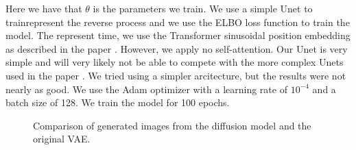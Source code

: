 Here we have that $\theta$ is the parameters we train. We use a simple Unet to trainrepresent the reverse process and we use the ELBO loss function to train the model. The represent time, we use the  Transformer sinusoidal position embedding as described in the paper \cite{diffusion}. However, we apply no self-attention. Our Unet is very simple and will very likely not be able to compete with the more complex Unets used in the paper \cite{diffusion}. We tried using a simpler arcitecture, but the results were not nearly as good. We use the Adam optimizer with a learning rate of $10^{-4}$ and a batch size of 128. We train the model for 100 epochs.

\begin{figure}[h]
    \centering
    \setlength{\belowcaptionskip}{-10pt}
    \caption{Comparison of generated images from the diffusion model and the original VAE.}
    \label{fig:example}%
\end{figure}

